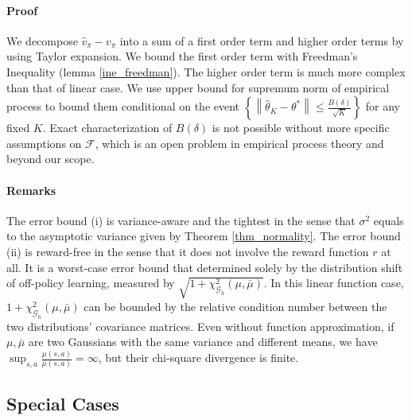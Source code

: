 \documentclass{article}
\def\mw#1{\textcolor{red}{mw:#1}}
\numberwithin{equation}{section}
\theoremstyle{plain}
\theoremstyle{definition}
\theoremstyle{remark}
\begin{document}
\paragraph{Proof} We decompose $\widehat{v}_{\pi} - v_{\pi}$ into a sum of a first order term and higher order terms by using Taylor expansion. We bound the first order term with Freedman's Inequality (lemma \ref{ine_freedman}). The higher order term is much more complex than that of linear case. We use upper bound for supremum norm of empirical process to bound them conditional on the event $\left\{\left\|\widehat{\theta}_K - \theta^*\right\| \leq \frac{B(\delta)}{\sqrt{K}}\right\}$ for any fixed $K.$ Exact characterization of $B(\delta)$ is not possible without more specific assumptions on $\mathcal{F}$, which is an open problem in empirical process theory and beyond our scope.

\paragraph{Remarks}
The error bound (i) is variance-aware and the tightest in the sense that $\sigma^2$ equals to the asymptotic variance given by Theorem \ref{thm_normality}. The error bound (ii) is reward-free in the sense that it does not involve the reward function $r$ at all. It is a worst-case error bound that determined solely by the distribution shift of off-policy learning, measured by $\sqrt{1+\chi_{\mathcal{G}_{h}}^{2}(\mu, \bar{\mu})}$. In this linear function case, $1+\chi_{\mathcal{G}_{h}}^{2}(\mu, \bar{\mu})$ can be bounded by the relative condition number between the two distributions' covariance matrices. Even without function approximation, if $\mu,\bar\mu$ are two Gaussians with the same variance and different means, we have $\sup_{s,a} \frac{\mu(s,a)}{\bar\mu(s,a)}=\infty$, but their chi-square divergence is finite. %




\subsection{Special Cases}\label{sec:special_cases}
\end{document}
